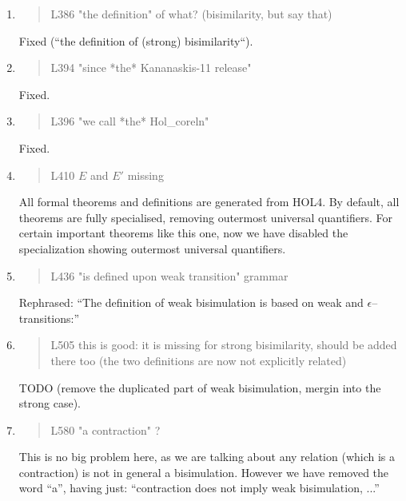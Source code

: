 \begin{enumerate}
\item \begin{quote}
    L386 "the definition" of what? (bisimilarity, but say that)
  \end{quote}
  Fixed (``the definition of (strong) bisimilarity``).
  
\item \begin{quote}
    L394 "since *the* Kananaskis-11 release"
  \end{quote}
  Fixed.

\item \begin{quote}
    L396 "we call *the* Hol_coreln"
  \end{quote}
  Fixed.
  
\item \begin{quote}
    L410 $E$ and $E'$ missing
  \end{quote}
  All formal theorems and definitions are generated from HOL4.
  By default, all theorems are fully specialised, removing outermost
  universal quantifiers. For certain important theorems like this one,
  now we have disabled the specialization showing outermost
  universal quantifiers.
  
\item \begin{quote}
    L436 "is defined upon weak transition" grammar
  \end{quote}

  Rephrased: ``The definition of weak bisimulation is based on weak
  and $\epsilon$--transitions:''
  
\item \begin{quote}
    L505 this is good: it is missing for strong bisimilarity, should
    be added there too (the two definitions are now not explicitly
    related)
  \end{quote}
TODO (remove the duplicated part of weak bisimulation, mergin into the
strong case).

\item \begin{quote}
    L580 "a contraction" ?
  \end{quote}
  This is no big problem here, as we are talking about any relation
  (which is a contraction) is not in general a bisimulation. However
  we have removed the word ``a'', having just: ``contraction does not imply weak bisimulation, ...''
  

\end{enumerate}
